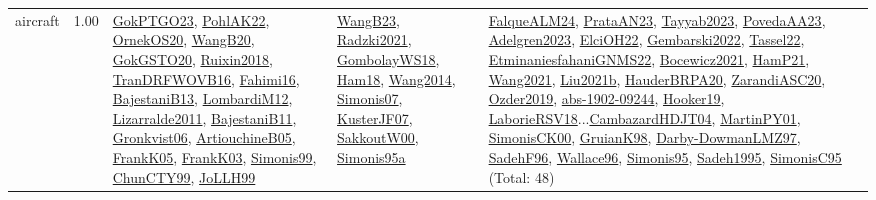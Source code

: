 {\begin{longtable}{p{3cm}r>{\raggedright\arraybackslash}p{6cm}>{\raggedright\arraybackslash}p{6cm}>{\raggedright\arraybackslash}p{8cm}}
\index{aircraft}\index{ApplicationAreas!aircraft}aircraft &  1.00 & \hyperref[detail:GokPTGO23]{GokPTGO23}, \hyperref[detail:PohlAK22]{PohlAK22}, \hyperref[detail:OrnekOS20]{OrnekOS20}, \hyperref[detail:WangB20]{WangB20}, \hyperref[detail:GokGSTO20]{GokGSTO20}, \hyperref[detail:Ruixin2018]{Ruixin2018}, \hyperref[detail:TranDRFWOVB16]{TranDRFWOVB16}, \hyperref[detail:Fahimi16]{Fahimi16}, \hyperref[detail:BajestaniB13]{BajestaniB13}, \hyperref[detail:LombardiM12]{LombardiM12}, \hyperref[detail:Lizarralde2011]{Lizarralde2011}, \hyperref[detail:BajestaniB11]{BajestaniB11}, \hyperref[detail:Gronkvist06]{Gronkvist06}, \hyperref[detail:ArtiouchineB05]{ArtiouchineB05}, \hyperref[detail:FrankK05]{FrankK05}, \hyperref[detail:FrankK03]{FrankK03}, \hyperref[detail:Simonis99]{Simonis99}, \hyperref[detail:ChunCTY99]{ChunCTY99}, \hyperref[detail:JoLLH99]{JoLLH99} & \hyperref[detail:WangB23]{WangB23}, \hyperref[detail:Radzki2021]{Radzki2021}, \hyperref[detail:GombolayWS18]{GombolayWS18}, \hyperref[detail:Ham18]{Ham18}, \hyperref[detail:Wang2014]{Wang2014}, \hyperref[detail:Simonis07]{Simonis07}, \hyperref[detail:KusterJF07]{KusterJF07}, \hyperref[detail:SakkoutW00]{SakkoutW00}, \hyperref[detail:Simonis95a]{Simonis95a} & \hyperref[detail:FalqueALM24]{FalqueALM24}, \hyperref[detail:PrataAN23]{PrataAN23}, \hyperref[detail:Tayyab2023]{Tayyab2023}, \hyperref[detail:PovedaAA23]{PovedaAA23}, \hyperref[detail:Adelgren2023]{Adelgren2023}, \hyperref[detail:ElciOH22]{ElciOH22}, \hyperref[detail:Gembarski2022]{Gembarski2022}, \hyperref[detail:Tassel22]{Tassel22}, \hyperref[detail:EtminaniesfahaniGNMS22]{EtminaniesfahaniGNMS22}, \hyperref[detail:Bocewicz2021]{Bocewicz2021}, \hyperref[detail:HamP21]{HamP21}, \hyperref[detail:Wang2021]{Wang2021}, \hyperref[detail:Liu2021b]{Liu2021b}, \hyperref[detail:HauderBRPA20]{HauderBRPA20}, \hyperref[detail:ZarandiASC20]{ZarandiASC20}, \hyperref[detail:Ozder2019]{Ozder2019}, \hyperref[detail:abs-1902-09244]{abs-1902-09244}, \hyperref[detail:Hooker19]{Hooker19}, \hyperref[detail:LaborieRSV18]{LaborieRSV18}...\hyperref[detail:CambazardHDJT04]{CambazardHDJT04}, \hyperref[detail:MartinPY01]{MartinPY01}, \hyperref[detail:SimonisCK00]{SimonisCK00}, \hyperref[detail:GruianK98]{GruianK98}, \hyperref[detail:Darby-DowmanLMZ97]{Darby-DowmanLMZ97}, \hyperref[detail:SadehF96]{SadehF96}, \hyperref[detail:Wallace96]{Wallace96}, \hyperref[detail:Simonis95]{Simonis95}, \hyperref[detail:Sadeh1995]{Sadeh1995}, \hyperref[detail:SimonisC95]{SimonisC95} (Total: 48)\\

\end{longtable}}
